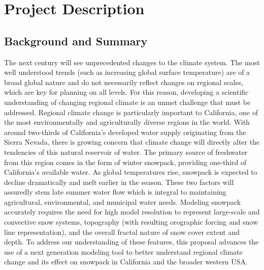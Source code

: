 \documentclass[11pt]{article}
\begin{document}
  



\section{Project Description}
\subsection{Background and Summary}
The next century will see unprecedented changes to the climate system. The most well understood trends (such as increasing global surface temperature) are of a broad global nature and do not necessarily reflect changes on regional scales, which are key for planning on all levels. For this reason, developing a scientific understanding of changing regional climate is an unmet challenge that must be addressed. Regional climate change is particularly important to California, one of the most environmentally and agriculturally diverse regions in the world. With around two-thirds of California's developed water supply originating from the Sierra Nevada, there is growing concern that climate change will directly alter the tendencies of this natural reservoir of water.  The primary source of freshwater from this region comes in the form of winter snowpack, providing one-third of California's available water.  As global temperatures rise, snowpack is expected to decline dramatically and melt earlier in the season.  These two factors will assuredly stem late summer water flow which is integral to maintaining agricultural, environmental, and municipal water needs.  Modeling snowpack accurately requires the need for high model resolution to represent large-scale and convective snow systems, topography (with resulting orographic forcing and snow line representation), and the overall fractal nature of snow cover extent and depth. To address our understanding of these features, this proposal advances the use of a next generation modeling tool to better understand regional climate change and its effect on snowpack in California and the broader western USA.
\\\\
\end{document}
